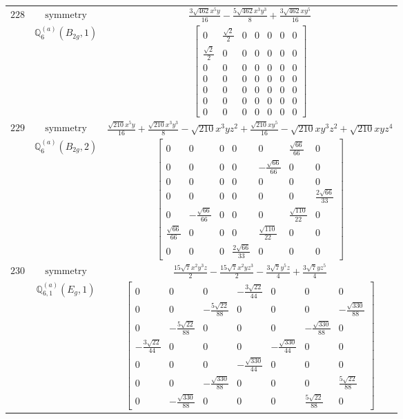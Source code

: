 \documentclass[fleqn,8pt,landscape]{jsarticle}
\begin{document}
\begin{longtable}{ccc}
$ 228 $ & $ \text{symmetry} $ & $ \frac{3 \sqrt{462} x^{5} y}{16} - \frac{5 \sqrt{462} x^{3} y^{3}}{8} + \frac{3 \sqrt{462} x y^{5}}{16} $ \\
$  $ & $ \mathbb{Q}_{6}^{(a)}(B_{2g},1) $ & $ \begin{bmatrix} 0 & \frac{\sqrt{2}}{2} & 0 & 0 & 0 & 0 & 0 \\ \frac{\sqrt{2}}{2} & 0 & 0 & 0 & 0 & 0 & 0 \\ 0 & 0 & 0 & 0 & 0 & 0 & 0 \\ 0 & 0 & 0 & 0 & 0 & 0 & 0 \\ 0 & 0 & 0 & 0 & 0 & 0 & 0 \\ 0 & 0 & 0 & 0 & 0 & 0 & 0 \\ 0 & 0 & 0 & 0 & 0 & 0 & 0 \end{bmatrix} $ \\ \hline
$ 229 $ & $ \text{symmetry} $ & $ \frac{\sqrt{210} x^{5} y}{16} + \frac{\sqrt{210} x^{3} y^{3}}{8} - \sqrt{210} x^{3} y z^{2} + \frac{\sqrt{210} x y^{5}}{16} - \sqrt{210} x y^{3} z^{2} + \sqrt{210} x y z^{4} $ \\
$  $ & $ \mathbb{Q}_{6}^{(a)}(B_{2g},2) $ & $ \begin{bmatrix} 0 & 0 & 0 & 0 & 0 & \frac{\sqrt{66}}{66} & 0 \\ 0 & 0 & 0 & 0 & - \frac{\sqrt{66}}{66} & 0 & 0 \\ 0 & 0 & 0 & 0 & 0 & 0 & 0 \\ 0 & 0 & 0 & 0 & 0 & 0 & \frac{2 \sqrt{66}}{33} \\ 0 & - \frac{\sqrt{66}}{66} & 0 & 0 & 0 & \frac{\sqrt{110}}{22} & 0 \\ \frac{\sqrt{66}}{66} & 0 & 0 & 0 & \frac{\sqrt{110}}{22} & 0 & 0 \\ 0 & 0 & 0 & \frac{2 \sqrt{66}}{33} & 0 & 0 & 0 \end{bmatrix} $ \\ \hline
$ 230 $ & $ \text{symmetry} $ & $ \frac{15 \sqrt{7} x^{2} y^{3} z}{2} - \frac{15 \sqrt{7} x^{2} y z^{3}}{2} - \frac{3 \sqrt{7} y^{5} z}{4} + \frac{3 \sqrt{7} y z^{5}}{4} $ \\
$  $ & $ \mathbb{Q}_{6,1}^{(a)}(E_{g},1) $ & $ \begin{bmatrix} 0 & 0 & 0 & - \frac{3 \sqrt{22}}{44} & 0 & 0 & 0 \\ 0 & 0 & - \frac{5 \sqrt{22}}{88} & 0 & 0 & 0 & - \frac{\sqrt{330}}{88} \\ 0 & - \frac{5 \sqrt{22}}{88} & 0 & 0 & 0 & - \frac{\sqrt{330}}{88} & 0 \\ - \frac{3 \sqrt{22}}{44} & 0 & 0 & 0 & - \frac{\sqrt{330}}{44} & 0 & 0 \\ 0 & 0 & 0 & - \frac{\sqrt{330}}{44} & 0 & 0 & 0 \\ 0 & 0 & - \frac{\sqrt{330}}{88} & 0 & 0 & 0 & \frac{5 \sqrt{22}}{88} \\ 0 & - \frac{\sqrt{330}}{88} & 0 & 0 & 0 & \frac{5 \sqrt{22}}{88} & 0 \end{bmatrix} $ \\ \hline

\end{longtable}
\end{document}

